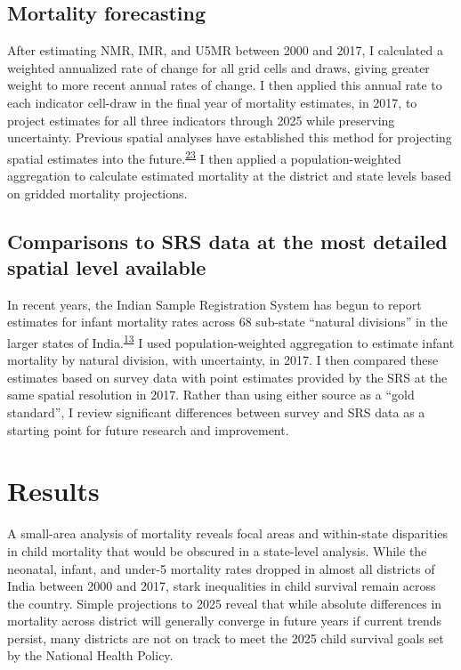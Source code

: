 \documentclass[
]{article}
\begin{document}
\hypertarget{mortality-forecasting}{%
\subsection{Mortality forecasting}\label{mortality-forecasting}}

After estimating NMR, IMR, and U5MR between 2000 and 2017, I calculated a weighted annualized rate of change for all grid cells and draws, giving greater weight to more recent annual rates of change. I then applied this annual rate to each indicator cell-draw in the final year of mortality estimates, in 2017, to project estimates for all three indicators through 2025 while preserving uncertainty. Previous spatial analyses have established this method for projecting spatial estimates into the future.\textsuperscript{\protect\hyperlink{ref-Osgood-Zimmerman2018}{23}} I then applied a population-weighted aggregation to calculate estimated mortality at the district and state levels based on gridded mortality projections.

\hypertarget{comparisons-to-srs-data-at-the-most-detailed-spatial-level-available}{%
\subsection{Comparisons to SRS data at the most detailed spatial level available}\label{comparisons-to-srs-data-at-the-most-detailed-spatial-level-available}}

In recent years, the Indian Sample Registration System has begun to report estimates for infant mortality rates across 68 sub-state ``natural divisions'' in the larger states of India.\textsuperscript{\protect\hyperlink{ref-CensusofIndia2017}{13}} I used population-weighted aggregation to estimate infant mortality by natural division, with uncertainty, in 2017. I then compared these estimates based on survey data with point estimates provided by the SRS at the same spatial resolution in 2017. Rather than using either source as a ``gold standard'', I review significant differences between survey and SRS data as a starting point for future research and improvement.

\hypertarget{results}{%
\section{Results}\label{results}}

A small-area analysis of mortality reveals focal areas and within-state disparities in child mortality that would be obscured in a state-level analysis. While the neonatal, infant, and under-5 mortality rates dropped in almost all districts of India between 2000 and 2017, stark inequalities in child survival remain across the country. Simple projections to 2025 reveal that while absolute differences in mortality across district will generally converge in future years if current trends persist, many districts are not on track to meet the 2025 child survival goals set by the National Health Policy.
\end{document}

